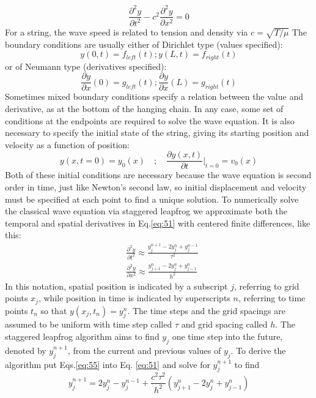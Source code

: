 \begin{equation}\label{eq:51}
	\frac{\partial^2 y}{\partial t^2} - c^2 \frac{\partial^2 y}{\partial x^2} = 0
\end{equation}
For a string, the wave speed is related to tension and density via $c = \sqrt{T / \mu} $ The
boundary conditions are usually either of Dirichlet type (values specified):
\begin{equation}\label{eq:52}
	y(0,t) = f_{left}(t) ; y(L,t) = f_{right}(t)
\end{equation}
or of Neumann type (derivatives specified):
\begin{equation}\label{eq:53}
	\frac{\partial y}{\partial x} (0)  = g_{left}(t) ; \frac{\partial y}{\partial x} (L)  = g_{right}(t)
\end{equation}
Sometimes mixed boundary conditions specify a relation between the value
and derivative, as at the bottom of the hanging chain. In any case, some set of
conditions at the endpoints are required to solve the wave equation. It is also
necessary to specify the initial state of the string, giving its starting position and
velocity as a function of position:
\begin{equation}\label{eq:54}
	y(x,t = 0) = y_0(x) \quad ; \quad \frac{\partial y(x,t)}{\partial t} \vert_{t=0} = v_0 (x)
\end{equation}
Both of these initial conditions are necessary because the wave equation is second
order in time, just like Newton\rq s second law, so initial displacement and velocity
must be specified at each point to find a unique solution.
To numerically solve the classical wave equation via staggered leapfrog we
approximate both the temporal and spatial derivatives in Eq.\eqref{eq:51} with centered
finite differences, like this:
\begin{equation}\label{eq:55}
\begin{aligned}
&\frac{\partial^{2} y}{\partial t^{2}} \approx \frac{y_{j}^{n+1}-2 y_{j}^{n}+y_{j}^{n-1}}{\tau^{2}} \\
&\frac{\partial^{2} y}{\partial x^{2}} \approx \frac{y_{j+1}^{n}-2 y_{j}^{n}+y_{j-1}^{n}}{h^{2}}
\end{aligned}
\end{equation}
In this notation, spatial position is indicated by a subscript $j$, referring to grid
points $x_j$, while position in time is indicated by superscripts $n$, referring to time
points $t_n$ so that $y(x_j,t_n) = y_j^n$. The time steps and the grid spacings are assumed to be uniform with time step called
$\tau$ and grid spacing called $h$. The staggered leapfrog algorithm aims to find $y_j$ one time step into the future, denoted by $y_j^{n+1}$,
from the current and previous values of $y_j$. To derive the algorithm put Eqs.\eqref{eq:55} into Eq. \eqref{eq:51} and solve for $y_j^{n+1}$ to find
\begin{equation}\label{eq:56}
	y_j^{n+1} = 2y_j^n - y_j^{n-1} + \frac{c^2 \tau^2}{h^2}(y_{j+1}^n - 2y^n_j + y^n_{j-1})
\end{equation}

